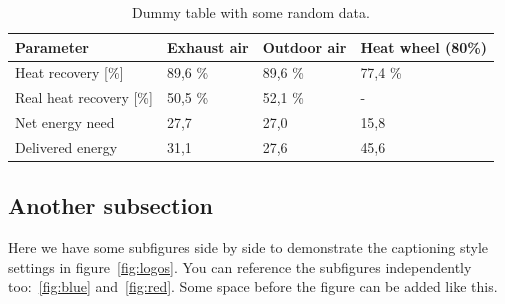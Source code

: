 \documentclass[12pt, a4paper, oneside]{article}
\begin{document}
\begin{table}[t]
    \centering
    \caption[Dummy table]{Dummy table with some random data.}
    \begin{tabularx}{\textwidth}{Xlll}
        \toprule
        \textbf{Parameter}      & \textbf{Exhaust air} & \textbf{Outdoor air} & \textbf{Heat wheel (80\%)} \\
        \midrule
        Heat recovery [\%]      & 89,6 \%              & 89,6 \%              & 77,4 \%                    \\
        Real heat recovery [\%] & 50,5 \%              & 52,1 \%              & -                          \\
        Net energy need         & 27,7                 & 27,0                 & 15,8                       \\
        Delivered energy        & 31,1                 & 27,6                 & 45,6                       \\
        \bottomrule
    \end{tabularx}
    \label{tab:example}
\end{table}

\subsection{Another subsection} \label{subsec:another-subsection}

Here we have some subfigures side by side to demonstrate the captioning style settings in figure~\ref{fig:logos}.
You can reference the subfigures independently too:~\ref{fig:blue} and~\ref{fig:red}.
Some space before the figure can be added like this. \medskip
\end{document}
